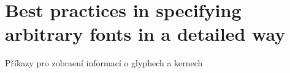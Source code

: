 \section{Best practices in specifying arbitrary fonts in a detailed way}

Příkazy pro zobraení informací o glyphech a kernech

\showglyphs \showkerns

